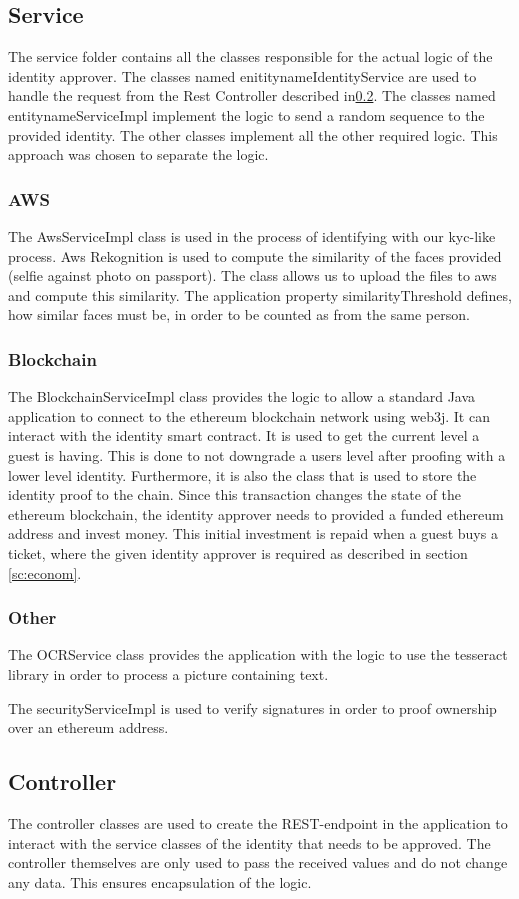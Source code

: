 \subsection{Service}
The service folder contains all the classes responsible for the actual logic of the identity approver. The classes named enititynameIdentityService are used to handle the request from the Rest Controller described in\ref{sec:controller}. The classes named entitynameServiceImpl implement the logic to send a random sequence to the provided identity.
The other classes implement all the other required logic. This approach was chosen to separate the logic. 

\subsubsection{AWS}
The AwsServiceImpl class is used in the process of identifying with our kyc-like process. Aws Rekognition is used to compute the similarity of the faces provided (selfie against photo on passport). The class allows us to upload the files to aws and compute this similarity. The application property similarityThreshold defines, how similar faces must be, in order to be counted as from the same person.

\subsubsection{Blockchain}
The BlockchainServiceImpl class provides the logic to allow a standard Java application to connect to the ethereum blockchain network using web3j. It can interact with the identity smart contract. It is used to get the current level a guest is having. This is done to not downgrade a users level after proofing with a lower level identity. Furthermore, it is also the class that is used to store the identity proof to the chain. Since this transaction changes the state of the ethereum blockchain, the identity approver needs to provided a funded ethereum address and invest money. This initial investment is repaid when a guest buys a ticket, where the given identity approver is required as described in section \ref{sc:econom}.

\subsubsection{Other}
The OCRService class provides the application with the logic to use the tesseract library in order to process a picture containing text. 

The securityServiceImpl is used to verify signatures in order to proof ownership over an ethereum address.


\subsection{Controller}\label{sec:controller}
The controller classes are used to create the REST-endpoint in the application to interact with the service classes of the identity that needs to be approved. The controller themselves are only used to pass the received values and do not change any data. This ensures encapsulation of the logic.

